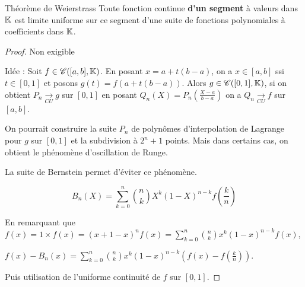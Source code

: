 \begin{theoreme}{Théorème de Weierstrass}{}
    Toute fonction continue \textbf{d'un segment} à valeurs dans $\mathbb{K}$ est limite uniforme sur ce segment 
    d'une suite de fonctions polynomiales à coefficients dans $\mathbb{K}$.
\end{theoreme}

\begin{proof}
    Non exigible 

    Idée : Soit $f \in \mathscr C([a, b], \mathbb{K})$. En posant $x = a + t (b - a)$, on a 
    $x \in [a, b]$ ssi $t \in [0, 1]$ et posons $g(t) = f(a + t (b - a))$. 
    Alors $g \in \mathscr C([0, 1], \mathbb{K})$, si on obtient $P_n \xrightarrow[CU]{} g$ sur $[0, 1]$
    en posant $Q_n(X) = P_n \left( \frac{X - a}{b - a} \right)$ on a $Q_n \xrightarrow[CU]{} f$ sur $[a, b]$.

    On pourrait construire la suite $P_n$ de polynômes d'interpolation de Lagrange pour 
    $g$ sur $[0, 1]$ et la subdivision à $2^{n} + 1$ points. Mais dans certains cas, on obtient 
    le phénomène d'oscillation de Runge.

    La suite de Bernstein permet d'éviter ce phénomène.

    $$B_n(X) = \sum_{k = 0}^{n} \binom{n}{k} X^k (1 - X)^{n - k} f\left( \frac k n \right)$$

    En remarquant que $\displaystyle f(x) = 1 \times f(x) = (x + 1 - x)^n f(x) = \sum_{k = 0}^{n} \binom{n}{k} x^k (1 - x)^{n - k} f(x)$,

    $\displaystyle f(x) - B_n(x) = \sum_{k = 0}^{n} \binom{n}{k} x^k (1 - x)^{n - k} \left( f(x) - f\left( \frac k n \right) \right)$.

    Puis utilisation de l'uniforme continuité de $f$ sur $[0, 1]$.
\end{proof}


